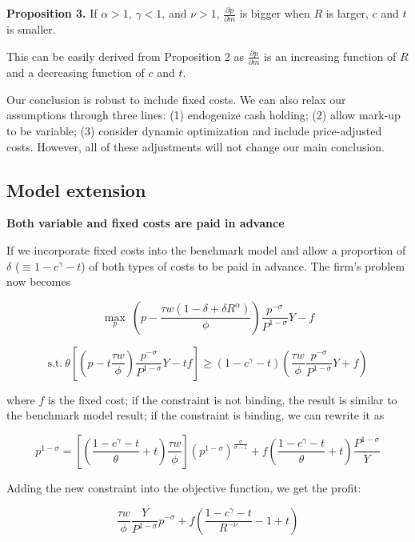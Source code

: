 \textbf{Proposition 3.} If $\alpha>1$, $\gamma<1$, and $\nu>1$, $\frac{\partial p}{\partial m}$ is bigger when $R$ is larger, $c$ and $t$ is smaller.

This can be easily derived from Proposition 2 as $\frac{\partial p}{\partial m}$ is an increasing function of $R$ and a decreasing function of $c$ and $t$.  


Our conclusion is robust to include fixed costs. We can also relax our assumptions through three lines: (1) endogenize cash holding; (2) allow mark-up to be variable; (3) consider dynamic optimization and include price-adjusted costs. However, all of these adjustments will not change our main conclusion.

\subsection{Model extension}


\textbf{Both variable and fixed costs are paid in advance}

If we incorporate fixed costs into the benchmark model and allow a proportion of $\delta$ ($\equiv 1-c^{\gamma}-t$) of both types of costs to be paid in advance. The firm's problem now becomes

$$
\max_{p} \ (p- \frac{\tau w(1-\delta+\delta R^\alpha)}{\phi}) \frac{p^{-\sigma}}{P^{1-\sigma}} Y-f
$$

\begin{equation}
\text{s.t.} \ \theta [(p -t \frac{\tau w}{\phi}) \frac{p^{-\sigma}}{P^{1-\sigma}} Y -tf ]\geq(1-c^\gamma-t) (\frac{\tau w}{\phi} \frac{p^{-\sigma}}{P^{1-\sigma}} Y+f)
\end{equation}

where $f$ is the fixed cost; if the constraint is not binding, the result is similar to the benchmark model result; if the constraint is binding, we can rewrite it as 

\begin{equation}\label{eq:constraint_fixedcost}
p^{1-\sigma}=[(\frac{1-c^{\gamma}-t}{\theta}+t)\frac{\tau w}{\phi}] (p^{1-\sigma})^{\frac{\sigma}{\sigma-1}}+f(\frac{1-c^{\gamma}-t}{\theta}+t)\frac{P^{1-\sigma}}{Y}
\end{equation}

Adding the new constraint into the objective function, we get the profit: 

\begin{equation}
[\frac{1-c^\gamma-t}{R^{-\nu}}-c^\gamma-(1-c^\gamma-t)R^{\alpha}]\frac{\tau w}{\phi} \frac{Y}{P^{1-\sigma}}p^{-\sigma}+f(\frac{1-c^\gamma-t}{R^{-\nu}}-1+t)
\end{equation}

